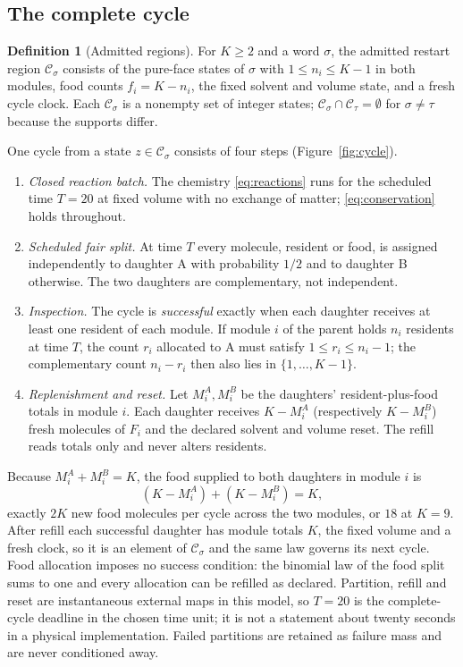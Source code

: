 \documentclass[11pt,a4paper]{article}
\theoremstyle{plain}
\theoremstyle{definition}
\newtheorem{definition}[theorem]{Definition}
\theoremstyle{remark}
\newcommand{\cC}{\mathcal C}
\begin{document}
\subsection{The complete cycle}\label{sec:cycle}
\begin{definition}[Admitted regions]
For $K\ge2$ and a word $\sigma$, the admitted restart region $\cC_\sigma$ consists of the pure-face states of $\sigma$ with $1\le n_i\le K-1$ in both modules, food counts $f_i=K-n_i$, the fixed solvent and volume state, and a fresh cycle clock. Each $\cC_\sigma$ is a nonempty set of integer states; $\cC_\sigma\cap\cC_\tau=\emptyset$ for $\sigma\ne\tau$ because the supports differ.
\end{definition}

One cycle from a state $z\in\cC_\sigma$ consists of four steps (Figure~\ref{fig:cycle}).
\begin{enumerate}
\item \emph{Closed reaction batch.} The chemistry \eqref{eq:reactions} runs for the scheduled time $T=20$ at fixed volume with no exchange of matter; \eqref{eq:conservation} holds throughout.
\item \emph{Scheduled fair split.} At time $T$ every molecule, resident or food, is assigned independently to daughter A with probability $1/2$ and to daughter B otherwise. The two daughters are complementary, not independent.
\item \emph{Inspection.} The cycle is \emph{successful} exactly when each daughter receives at least one resident of each module. If module $i$ of the parent holds $n_i$ residents at time $T$, the count $r_i$ allocated to A must satisfy $1\le r_i\le n_i-1$; the complementary count $n_i-r_i$ then also lies in $\{1,\dots,K-1\}$.
\item \emph{Replenishment and reset.} Let $M_i^{A},M_i^{B}$ be the daughters' resident-plus-food totals in module $i$. Each daughter receives $K-M_i^{A}$ (respectively $K-M_i^{B}$) fresh molecules of $F_i$ and the declared solvent and volume reset. The refill reads totals only and never alters residents.
\end{enumerate}
Because $M_i^A+M_i^B=K$, the food supplied to both daughters in module $i$ is
\begin{equation}\label{eq:refill}
 (K-M_i^A)+(K-M_i^B)=K ,
\end{equation}
exactly $2K$ new food molecules per cycle across the two modules, or $18$ at $K=9$. After refill each successful daughter has module totals $K$, the fixed volume and a fresh clock, so it is an element of $\cC_\sigma$ and the same law governs its next cycle. Food allocation imposes no success condition: the binomial law of the food split sums to one and every allocation can be refilled as declared. Partition, refill and reset are instantaneous external maps in this model, so $T=20$ is the complete-cycle deadline in the chosen time unit; it is not a statement about twenty seconds in a physical implementation. Failed partitions are retained as failure mass and are never conditioned away.
\end{document}
